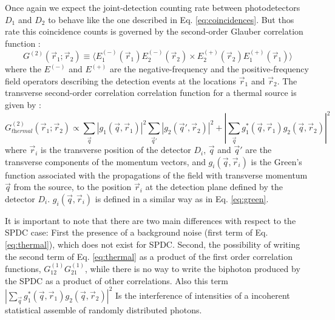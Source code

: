 Once again we expect the joint-detection counting rate between photodetectors $D_1$ and $D_2$ to behave
like the one described in Eq. \ref{eq:coincidences}. But thos rate this coincidence counts is governed
by the second-order Glauber correlation function \cite{glauber}:
\begin{equation}
G^{(2)} (\vec{r}_1; \vec{r}_2) \equiv \langle E^{(-)}_1(\vec{r}_1)E^{(-)}_2(\vec{r}_2) \times E^{(+)}_2(\vec{r}_2)E^{(+)}_1(\vec{r}_1) \rangle
\end{equation}
where the $E^{(-)}$ and $E^{(+)}$ are the negative-frequency and the positive-frequency field operators describing the detection events at the
locations $\vec{r}_1$ and $\vec{r}_2$. The transverse second-order correlation correlation function 
for a thermal source is given by \cite{thermalAlejandra}:
\begin{equation}\label{eq:thermal}
G^{(2)}_{\textit{thermal}}(\vec{r}_1; \vec{r}_2) \propto \sum_{\vec{q}} |g_1(\vec{q},\vec{r}_1)|^2
\sum_{\vec{q}'} |g_2(\vec{q}',\vec{r}_2)|^2 + |\sum_{\vec{q}} g_1^*(\vec{q},\vec{r}_1) g_2(\vec{q},\vec{r}_2)|^2
\end{equation}
where $\vec{r}_i$ is the transverse position of the detector $D_i$, $\vec{q}$ and $\vec{q}'$
are the transverse components of the momentum vectors, and $g_i(\vec{q},\vec{r}_i)$ is the Green's function 
associated with the propagations of the field with transverse momentum $\vec{q}$ from the source, 
to the position $\vec{r}_i$ at the detection plane defined by the detector $D_i$. $g_i(\vec{q},\vec{r}_i)$ is defined in a similar way 
as in Eq. \ref{eq:green}.

It is important to note that there are two main differences with respect to the SPDC case: 
First the presence of a background noise (first term of Eq. \ref{eq:thermal}), which does not exist for SPDC. Second,
the possibility of writing the second term of Eq. \ref{eq:thermal} as a product of the first order correlation
functions, $G^{(1)}_{12}G^{(1)}_{21}$, while there is no way to write the biphoton produced by the 
SPDC as a product of other correlations. Also this term $|\sum_{\vec{q}} g_1^*(\vec{q},\vec{r}_1) g_2(\vec{q},\vec{r}_2)|^2$
Is the interference of intensities of a incoherent statistical assemble of randomly distributed photons.


